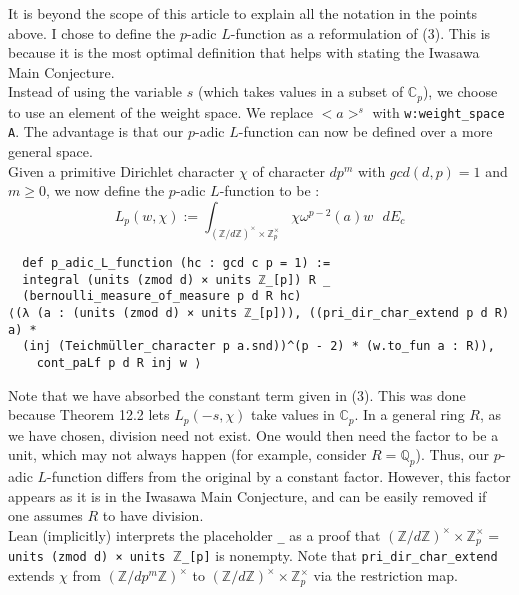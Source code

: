 \documentclass[11pt]{article}
\newcommand{\lean}[1]{\texttt{#1}\xspace} %
\begin{document}
It is beyond the scope of this article to explain all the notation in the points above. I chose to
define the $p$-adic $L$-function as a reformulation of (3). This is because it is the most optimal
definition that helps with stating the Iwasawa Main Conjecture. \\

Instead of using the variable $s$ (which takes values in a subset of $\mathbb{C}_p$), we choose to use an element of the weight space. We replace
$<a>^s$ with \lean{w:weight\_space A}. The advantage is that our $p$-adic $L$-function can now be defined over a more general space. \\

Given a primitive Dirichlet character $\chi$ of character $dp^m$ with $gcd(d, p) = 1$ and $m \ge 0$,
we now define the $p$-adic $L$-function to be :
$$ L_p(w, \chi) := \int_{(\mathbb{Z}/d \mathbb{Z})^{\times} \times \mathbb{Z}_p^{\times}}
\chi \omega^{p - 2} (a) w \text{    } dE_c $$

\begin{lstlisting}
  def p_adic_L_function (hc : gcd c p = 1) :=
  integral (units (zmod d) × units ℤ_[p]) R _ 
  (bernoulli_measure_of_measure p d R hc)
⟨(λ (a : (units (zmod d) × units ℤ_[p])), ((pri_dir_char_extend p d R) a) *
  (inj (Teichmüller_character p a.snd))^(p - 2) * (w.to_fun a : R)), 
    cont_paLf p d R inj w ⟩
\end{lstlisting}

Note that we have absorbed the constant term given in (3). This was done because Theorem 12.2 lets $L_p(-s, \chi)$ take values in $\mathbb{C}_p$. 
In a general ring $R$, as we have chosen, division need not exist. One would then need the factor to be a unit, which may not always happen 
(for example, consider $R = \mathbb{Q}_p$). Thus, our $p$-adic $L$-function differs from the original by a constant factor. 
However, this factor appears as it is in the Iwasawa Main Conjecture, and can be easily removed if one assumes $R$ to have division. \\

Lean (implicitly) interprets the placeholder \lean{\_} as a proof that 
\newline $(\mathbb{Z}/d \mathbb{Z})^{\times} \times \mathbb{Z}_p^{\times} = $ \lean{units (zmod d) × units $\mathbb{Z}$\_[p]} is nonempty. 
Note that \lean{pri\_dir\_char\_extend} extends $\chi$
from $(\mathbb{Z}/ dp^m \mathbb{Z})^{\times}$ to $(\mathbb{Z}/ d \mathbb{Z})^{\times} \times \mathbb{Z}_p^{\times}$ via the restriction map. \\
\end{document}

